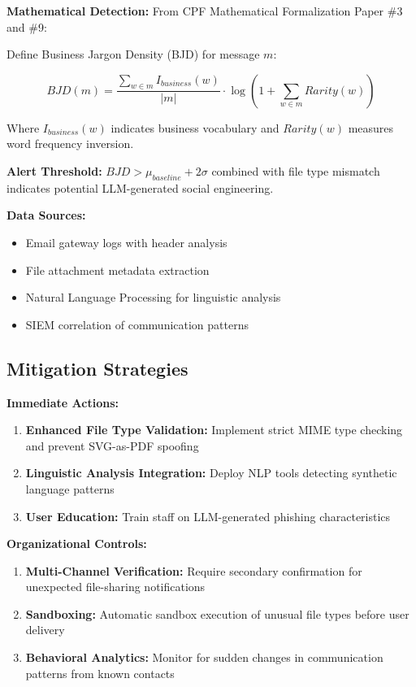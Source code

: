 \documentclass[11pt,a4paper]{article}
\begin{document}
\textbf{Mathematical Detection:} From CPF Mathematical Formalization Paper \#3 and \#9:

Define Business Jargon Density (BJD) for message $m$:

\begin{equation}
BJD(m) = \frac{\sum_{w \in m} I_{business}(w)}{|m|} \cdot \log\left(1 + \sum_{w \in m} Rarity(w)\right)
\end{equation}

Where $I_{business}(w)$ indicates business vocabulary and $Rarity(w)$ measures word frequency inversion.

\textbf{Alert Threshold:} $BJD > \mu_{baseline} + 2\sigma$ combined with file type mismatch indicates potential LLM-generated social engineering.

\textbf{Data Sources:}
\begin{itemize}
\item Email gateway logs with header analysis
\item File attachment metadata extraction
\item Natural Language Processing for linguistic analysis
\item SIEM correlation of communication patterns
\end{itemize}

\subsection{Mitigation Strategies}

\textbf{Immediate Actions:}
\begin{enumerate}
\item \textbf{Enhanced File Type Validation:} Implement strict MIME type checking and prevent SVG-as-PDF spoofing
\item \textbf{Linguistic Analysis Integration:} Deploy NLP tools detecting synthetic language patterns
\item \textbf{User Education:} Train staff on LLM-generated phishing characteristics
\end{enumerate}

\textbf{Organizational Controls:}
\begin{enumerate}
\item \textbf{Multi-Channel Verification:} Require secondary confirmation for unexpected file-sharing notifications
\item \textbf{Sandboxing:} Automatic sandbox execution of unusual file types before user delivery
\item \textbf{Behavioral Analytics:} Monitor for sudden changes in communication patterns from known contacts
\end{enumerate}
\end{document}
